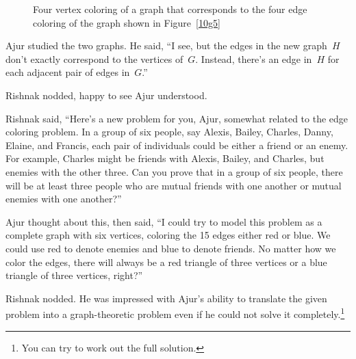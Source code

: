 \begin{figure}
\begin{center}


\caption{Four vertex coloring of a graph that corresponds to the four edge coloring of the graph shown in Figure~\ref{10g5}}\label{10g55}
\end{center}
\end{figure}

Ajur studied the two graphs. He said, ``I see, but the edges in the new graph~$H$ don't exactly correspond to the vertices of~$G$. Instead, there's an edge in~$H$ for each adjacent pair of edges in~$G$.''

Rishnak nodded, happy to see Ajur understood.

Rishnak said, ``Here's a new problem for you, Ajur, somewhat related to the edge coloring problem. In a group of six people, say Alexis, Bailey, Charles, Danny, Elaine, and Francis, each pair of individuals could be either a friend or an enemy. For example, Charles might be friends with Alexis, Bailey, and Charles, but enemies with the other three. Can you prove that in a group of six people, there will be at least three people who are mutual friends with one another or mutual enemies with one another?'' 

Ajur thought about this, then said, ``I could try to model this problem as a complete graph with six vertices, coloring the 15 edges either red or blue. We could use red to denote enemies and blue to denote friends. No matter how we color the edges, there will always be a red triangle of three vertices or a blue triangle of three vertices, right?''

Rishnak nodded. He was impressed with Ajur's ability to translate the given problem into a graph-theoretic problem even if he could not solve it completely.\footnote{You can try to work out the full solution.}

